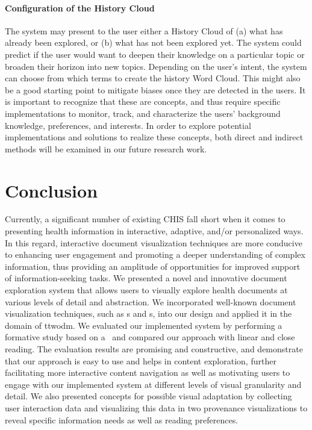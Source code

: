 \paragraph*{Configuration of the History Cloud} 
The system may present to the user either a History Cloud of (a) what has already been explored, or (b) what has not been explored yet. 
%
The system could predict if the user would want to deepen their knowledge on a particular topic or broaden their horizon into new topics. Depending on the user's intent, the system can choose from which terms to create the history Word Cloud. 
%
This might also be a good starting point to mitigate biases once they are detected in the users.
% 
It is important to recognize that these are concepts, and thus require specific implementations to monitor, track, and characterize the users' background knowledge, preferences, and interests. 
%
In order to explore potential implementations and solutions to realize these concepts, both direct and indirect methods will be examined in our future research work.



\section{Conclusion} \label{sec:conclusion}
%
Currently, a significant number of existing CHIS fall short when it comes to presenting health information in interactive, adaptive, and/or personalized ways. 
%
In this regard, interactive document visualization techniques are more conducive to enhancing user engagement and promoting a deeper understanding of complex information, thus providing an amplitude of opportunities for improved support of information-seeking tasks. 
%
We presented a novel and innovative document exploration system that allows users to visually explore health documents at various levels of detail and abstraction. 
%
We incorporated well-known document visualization techniques, such as \WordCloud s and \Tilebar s, into our design and applied it in the domain of \acrshort{ttwodm}. 
%
We evaluated our implemented system by performing a formative study based on a \cwt\ and compared our approach with linear and close reading. 
%
The evaluation results are promising and constructive, and demonstrate that our approach is easy to use and helps in content exploration, further facilitating more interactive content navigation as well as motivating users to engage with our implemented system at different levels of visual granularity and detail. 
%
We also presented concepts for possible visual adaptation by collecting user interaction data and visualizing this data in two provenance visualizations to reveal specific information needs as well as reading preferences.



